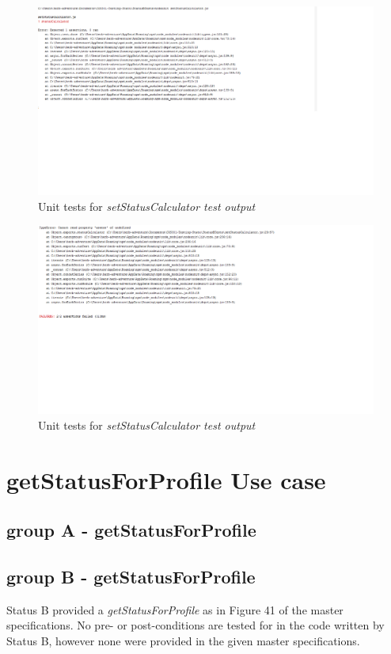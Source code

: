 \documentclass[a4paper,12pt]{article}
\begin{document}
	\begin{figure}
		\includegraphics[width=1.0\textwidth]{Figures/output1.png}
		\caption{Unit tests for \textit{setStatusCalculator test output}}
	\end{figure}
	\begin{figure}
		\includegraphics[width=1.0\textwidth]{Figures/output2.png}
		\caption{Unit tests for \textit{setStatusCalculator test output}}
	\end{figure}

\newpage
\section{getStatusForProfile Use case}
\subsection{group A - getStatusForProfile}


\subsection{group B - getStatusForProfile}
Status B provided a \textit{getStatusForProfile} as in Figure 41 of the master specifications. No pre- or post-conditions are tested for in the code written by Status B, however none were provided in the given master specifications.
\end{document}
